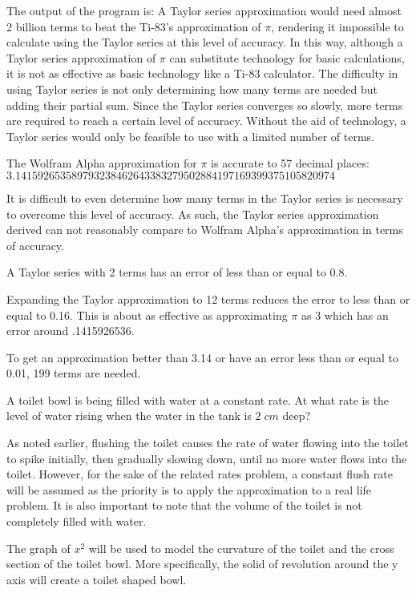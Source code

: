 The output of the program is:
A Taylor series approximation would need almost 2 billion terms to beat the Ti-83's approximation of \(\pi\), rendering it impossible to calculate using the Taylor series at this level of accuracy. In this way, although a Taylor series approximation of \(\pi\) can substitute technology for basic calculations, it is not as effective as basic technology like a Ti-83 calculator. The difficulty in using Taylor series is not only determining how many terms are needed but adding their partial sum. Since the Taylor series converges so slowly, more terms are required to reach a certain level of accuracy. Without the aid of technology, a Taylor series would only be feasible to use with a limited number of terms.

The Wolfram Alpha approximation for \(\pi\) is accurate to 57 decimal places: \\
\(3.141592653589793238462643383279502884197169399375105820974\)

It is difficult to even determine how many terms in the Taylor series is necessary to overcome this level of accuracy. As such, the Taylor series approximation derived can not reasonably compare to Wolfram Alpha's approximation in terms of accuracy.

A Taylor series with 2 terms has an error of less than or equal to 0.8.

Expanding the Taylor approximation to 12 terms reduces the error to less than or equal to 0.16. This is about as effective as approximating \(\pi\) as 3 which has an error around .1415926536.

To get an approximation better than 3.14 or have an error less than or equal to 0.01, 199 terms are needed. 

A toilet bowl is being filled with water at a constant rate. At what rate is the level of water rising when the water in the tank is \(2 \; cm\) deep?


As noted earlier, flushing the toilet causes the rate of water flowing into the toilet to spike initially, then gradually slowing down, until no more water flows into the toilet. However, for the sake of the related rates problem, a constant flush rate will be assumed as the priority is to apply the approximation to a real life problem. It is also important to note that the volume of the toilet is not completely filled with water.  

The graph of \(x^{2}\) will be used to model the curvature of the toilet and the cross section of the toilet bowl. More specifically, the solid of revolution around the y axis will create a toilet shaped bowl. 


